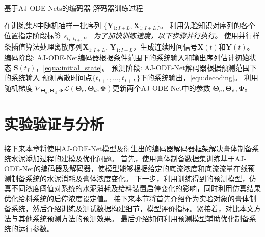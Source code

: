 \begin{algorithm*}[]
\caption{ 基于AJ-ODE-Nets的编码器-解码器训练过程 }
\label{alg:training}
\begin{algorithmic}[1]
\State  在训练集$S$中随机抽样一批序列 $\{\boldsymbol{Y}_{1:I+L}, {\boldsymbol {X}}_{1:I+L}\}$。
\State 利用先验知识对序列的各个位置指定阶段标签 $s_{t_1:t_{I+L}}$。
\State \text{//}\textit{为了加快训练速度，以下步骤并行执行。}
\State 使用并行样条插值算法处理离散序列${\boldsymbol {X}}_{1:I+L}$, $\boldsymbol{Y}_{1:I+L}$，生成连续时间信号$\boldsymbol X(t)$和$\boldsymbol Y(t)$。
\State 编码阶段: AJ-ODE-Net编码器根据条件范围下的系统输入和输出序列估计初始状态 $\boldsymbol{S}\left(t_{I}\right)$，\eqref{equa:initial_state}。
\State 预测阶段: AJ-ODE-Net解码器根据预测范围下的系统输入 预测离散时间点$\{t_{I+1}, \dots, t_{I+L}\}$下的系统输出，\eqref{equ:decoding}。
\State 利用随机梯度 $\nabla_{\boldsymbol{\Theta_{e}}, \boldsymbol{\Theta_{d}}, \boldsymbol \Phi}\mathcal{L}\left(\boldsymbol{\Theta}_{e}, \boldsymbol{\Theta}_{d}, \boldsymbol{\Phi}\right)$更新两个AJ-ODE-Net中的参数 $\boldsymbol{\Theta_{e}}, \boldsymbol{\Theta_{d}}, \boldsymbol \Phi$。
\EndFor
\EndFor
\end{algorithmic}
\end{algorithm*}


\section{实验验证与分析}
\label{sec:4_evalutaion}
接下来本章将使用AJ-ODE-Net模型及衍生出的编码器解码器框架解决膏体制备系统水泥添加过程的建模及优化问题。
首先，使用膏体制备数据集训练基于AJ-ODE-Net的编码器及解码器，使模型能够根据给定的底流浓度和底流流量在线预测制备系统的水泥消耗及膏体浓度变化。
下一步，利用训练得到的预测模型，仿真不同浓度阈值对系统的水泥消耗及给料装置启停变化的影响，同时利用仿真结果优化给料系统的启停浓度设定值。
接下来本节将首先介绍作为实验对象的膏体制备系统，然后介绍训练及测试数据构建细节，模型评价指标。紧接着，对比本文方法与其他系统预测方法的预测效果。
最后介绍如何利用预测模型辅助优化制备系统的运行参数。


